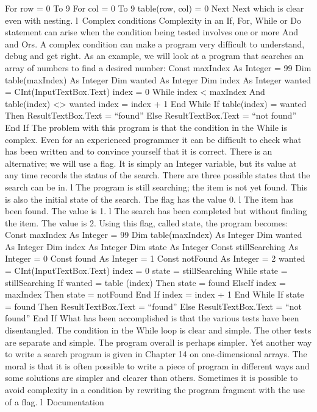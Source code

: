 For row = 0 To 9
	For col = 0 To 9
		table(row, col) = 0
	Next
Next
which is clear even with nesting.
l Complex conditions
Complexity in an If, For, While or Do statement can arise when the condition being tested involves one or more And and Ors. A complex condition can make a program very difﬁcult to understand, debug and get right. As an example, we will look at a program that searches an array of numbers to ﬁnd a desired number:
Const maxIndex As Integer = 99
Dim table(maxIndex) As Integer
Dim wanted As Integer
Dim index As Integer
wanted = CInt(InputTextBox.Text)
index = 0
While index < maxIndex And table(index) <> wanted
	index = index + 1
End While
If table(index) = wanted Then
	ResultTextBox.Text = “found”
Else
	ResultTextBox.Text = “not found”
End If
The problem with this program is that the condition in the While is complex. Even for an experienced programmer it can be difﬁcult to check what has been written and 
to convince yourself that it is correct. There is an alternative; we will use a ﬂag. It is 
simply an Integer variable, but its value at any time records the status of the search. There are three possible states that the search can be in.
l	The program is still searching; the item is not yet found. This is also the initial state of the search. The ﬂag has the value 0.
l	The item has been found. The value is 1.
l	The search has been completed but without ﬁnding the item. The value is 2.
Using this ﬂag, called state, the program becomes:
Const maxIndex As Integer = 99
Dim table(maxIndex) As Integer
Dim wanted As Integer
Dim index As Integer
Dim state As Integer
Const stillSearching As Integer = 0
Const found As Integer = 1
Const notFound As Integer = 2
wanted = CInt(InputTextBox.Text)
index = 0
state = stillSearching
While state = stillSearching
	If wanted = table (index) Then
		state = found
	ElseIf index = maxIndex Then
		state = notFound
	End If
	index = index + 1
End While
If state = found Then
	ResultTextBox.Text = “found”
Else
	ResultTextBox.Text = “not found”
End If
What has been accomplished is that the various tests have been disentangled. The condition in the While loop is clear and simple. The other tests are separate and simple. The program overall is perhaps simpler. Yet another way to write a search program is given in Chapter 14 on one-dimensional arrays.
The moral is that it is often possible to write a piece of program in different ways and some solutions are simpler and clearer than others. Sometimes it is possible to avoid complexity in a condition by rewriting the program fragment with the use of a ﬂag.
l Documentation
